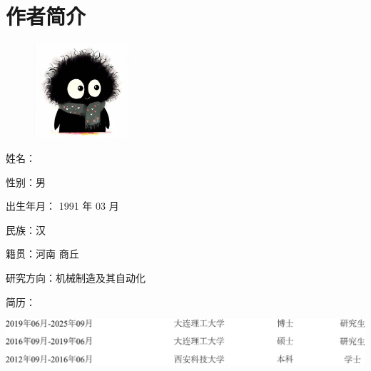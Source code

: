 \chapter{作者简介}



\begin{figure}  %
	\centering
	\vspace{-30pt}
	\includegraphics[width=3.5cm]{figures/others/Profile}  %
\end{figure}




\setlength{\parindent}{0pt}  %

姓名：\authorName	

性别：男	

出生年月： 1991   年  03 月  

民族：汉

籍贯：河南 商丘

研究方向：机械制造及其自动化



简历：

\begin{center}
	\includegraphics[width=1.0 \textwidth]{figures/ch0/ch0_Resume}
\end{center}


\setlength{\parindent}{2em}  %